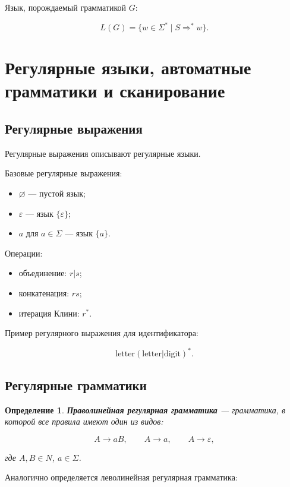 \documentclass[12pt,a4paper]{article}
\newtheorem{definition}{Определение}
\begin{document}
Язык, порождаемый грамматикой $G$:

\[
L(G) = \{w \in \Sigma^* \mid S \Rightarrow^* w\}.
\]

\section{Регулярные языки, автоматные грамматики и сканирование}

\subsection{Регулярные выражения}

Регулярные выражения описывают регулярные языки.

Базовые регулярные выражения:

\begin{itemize}
    \item $\varnothing$ --- пустой язык;
    \item $\varepsilon$ --- язык $\{\varepsilon\}$;
    \item $a$ для $a \in \Sigma$ --- язык $\{a\}$.
\end{itemize}

Операции:

\begin{itemize}
    \item объединение: $r|s$;
    \item конкатенация: $rs$;
    \item итерация Клини: $r^*$.
\end{itemize}

Пример регулярного выражения для идентификатора:

\[
\mathrm{letter}(\mathrm{letter}|\mathrm{digit})^*.
\]

\subsection{Регулярные грамматики}

\begin{definition}
\textbf{Праволинейная регулярная грамматика} --- грамматика, в которой все правила имеют один из видов:

\[
A \to aB,\qquad A \to a,\qquad A \to \varepsilon,
\]

где $A,B \in N$, $a \in \Sigma$.
\end{definition}

Аналогично определяется леволинейная регулярная грамматика:
\end{document}
